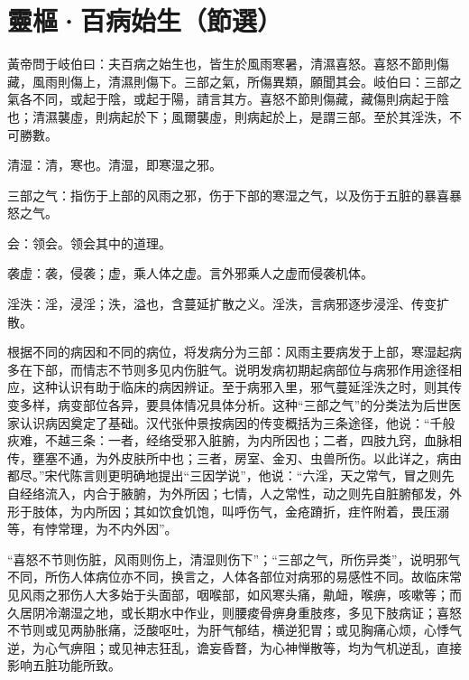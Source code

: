 \documentclass[draft,12pt]{ctexbook}
\begin{document}

\section{靈樞·百病始生（節選）}%


\begin{yuanwen}
黃帝問于岐伯曰：夫百病之始生也，皆生於風雨寒暑，清濕喜怒。喜怒不節則傷藏，風雨則傷上，清濕則傷下。三部之氣，所傷異類，願聞其会。岐伯曰：三部之氣各不同，或起于陰，或起于陽，請言其方。喜怒不節則傷藏，藏傷則病起于陰也；清濕襲虛，則病起於下；風爾襲虛，則病起於上，是謂三部。至於其淫泆，不可勝數。
\end{yuanwen}


\begin{jiaozhu}
	\item 清湿：清，寒也。清湿，即寒湿之邪。
	\item 三部之气：指伤于上部的风雨之邪，伤于下部的寒湿之气，以及伤于五脏的暴喜暴怒之气。
	\item 会：领会。领会其中的道理。
	\item 袭虚：袭，侵袭；虚，乘人体之虚。言外邪乘人之虚而侵袭机体。
	\item 淫泆：淫，浸淫；泆，溢也，含蔓延扩散之义。淫泆，言病邪逐步浸淫、传变扩散。
\end{jiaozhu}



根据不同的病因和不同的病位，将发病分为三部：风雨主要病发于上部，寒湿起病多在下部，而情志不节则多见内伤脏气。说明发病初期起病部位与病邪作用途径相应，这种认识有助于临床的病因辨证。至于病邪入里，邪气蔓延淫泆之时，则其传变多样，病变部位各异，要具体情况具体分析。这种“三部之气”的分类法为后世医家认识病因奠定了基础。汉代张仲景按病因的传变概括为三条途径，他说：“千般疢难，不越三条：一者，经络受邪入脏腑，为内所因也；二者，四肢九窍，血脉相传，壅塞不通，为外皮肤所中也；三者，房室、金刃、虫兽所伤。以此详之，病由都尽。”宋代陈言则更明确地提出“三因学说”，他说：“六淫，天之常气，冒之则先自经络流入，内合于腋腑，为外所因；七情，人之常性，动之则先自脏腑郁发，外形于肢体，为内所因；其如饮食饥饱，叫呼伤气，金疮蹐折，疰忤附着，畏压溺等，有悖常理，为不内外因”。


“喜怒不节则伤脏，风雨则伤上，清湿则伤下”；“三部之气，所伤异类”，说明邪气不同，所伤人体病位亦不同，换言之，人体各部位对病邪的易感性不同。故临床常见风雨之邪伤人大多始于头面部，咽喉部，如风寒头痛，鼽衄，喉痹，咳嗽等；而久居阴冷潮湿之地，或长期水中作业，则腰痠骨痹身重肢疼，多见下肢病证；喜怒不节则或见两胁胀痛，泛酸呕吐，为肝气郁结，横逆犯胃；或见胸痛心烦，心悸气逆，为心气痹阻；或见神志狂乱，谵妄昏瞀，为心神惮散等，均为气机逆乱，直接影响五脏功能所致。
\end{document}
